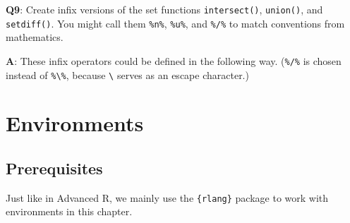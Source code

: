 \documentclass[
]{krantz}
\makeatletter
\newenvironment{Shaded}{\begin{snugshade}}{\end{snugshade}}
\newcommand{\CommentTok}[1]{\textcolor[rgb]{0.56,0.35,0.01}{\textit{#1}}}
\newcommand{\ControlFlowTok}[1]{\textcolor[rgb]{0.13,0.29,0.53}{\textbf{#1}}}
\newcommand{\DataTypeTok}[1]{\textcolor[rgb]{0.13,0.29,0.53}{#1}}
\newcommand{\KeywordTok}[1]{\textcolor[rgb]{0.13,0.29,0.53}{\textbf{#1}}}
\newcommand{\NormalTok}[1]{#1}
\newcommand{\OperatorTok}[1]{\textcolor[rgb]{0.81,0.36,0.00}{\textbf{#1}}}
\newcommand{\StringTok}[1]{\textcolor[rgb]{0.31,0.60,0.02}{#1}}
\newenvironment{kframe}{%
\medskip{}
\setlength{\fboxsep}{.8em}
 \def\at@end@of@kframe{}%
 \ifinner\ifhmode%
  \def\at@end@of@kframe{\end{minipage}}%
  \begin{minipage}{\columnwidth}%
 \fi\fi%
 \def\FrameCommand##1{\hskip\@totalleftmargin \hskip-\fboxsep
 \colorbox{shadecolor}{##1}\hskip-\fboxsep
     \hskip-\linewidth \hskip-\@totalleftmargin \hskip\columnwidth}%
 \MakeFramed {\advance\hsize-\width
   \@totalleftmargin\z@ \linewidth\hsize
   \@setminipage}}%
 {\par\unskip\endMakeFramed%
 \at@end@of@kframe}
\renewenvironment{Shaded}{\begin{kframe}}{\end{kframe}}
\renewcommand{\KeywordTok} [1]{\textcolor[rgb]{0.00,0.44,0.13}{{#1}}}
\renewcommand{\DataTypeTok}[1]{\textcolor[rgb]{0.56,0.13,0.00}{{#1}}}
\renewcommand{\StringTok}  [1]{\textcolor[rgb]{0.25,0.44,0.63}{{#1}}}
\renewcommand{\CommentTok} [1]{\textcolor[rgb]{0.38,0.63,0.69}{{#1}}}
\renewcommand{\NormalTok}  [1]{{#1}}
\makeatother
\begin{document}
\textbf{{Q9}}: Create infix versions of the set functions \texttt{intersect()}, \texttt{union()}, and \texttt{setdiff()}. You might call them \texttt{\%n\%}, \texttt{\%u\%}, and \texttt{\%/\%} to match conventions from mathematics.

\textbf{{A}}: These infix operators could be defined in the following way. (\texttt{\%/\%} is chosen instead of \texttt{\%\textbackslash{}\%}, because \texttt{\textbackslash{}} serves as an escape character.)

\begin{Shaded}
\end{Shaded}

\hypertarget{environments}{%
\chapter{Environments}\label{environments}}

\hypertarget{prerequisites-1}{%
\section*{Prerequisites}\label{prerequisites-1}}


Just like in Advanced R, we mainly use the \texttt{\{rlang\}} package to work with environments in this chapter.
\end{document}
